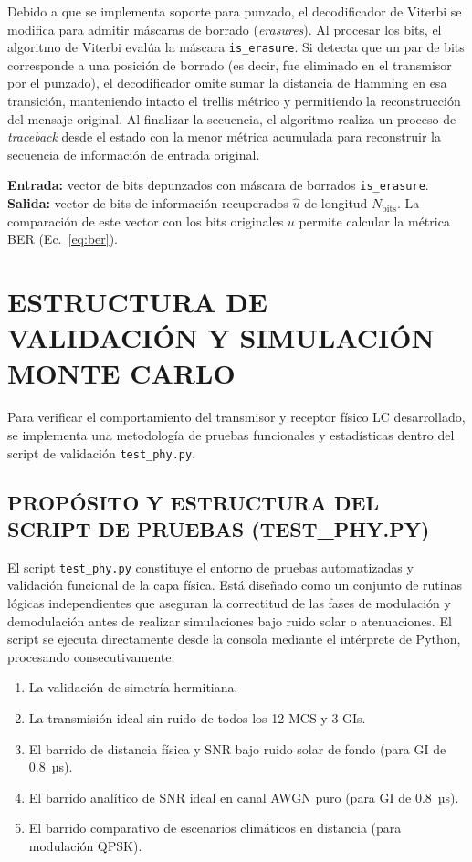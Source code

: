 Debido a que se implementa soporte para punzado, el decodificador de Viterbi se modifica para admitir máscaras de borrado (\textit{erasures}). Al procesar los bits, el algoritmo de Viterbi evalúa la máscara \texttt{is\_erasure}. Si detecta que un par de bits corresponde a una posición de borrado (es decir, fue eliminado en el transmisor por el punzado), el decodificador omite sumar la distancia de Hamming en esa transición, manteniendo intacto el trellis métrico y permitiendo la reconstrucción del mensaje original. Al finalizar la secuencia, el algoritmo realiza un proceso de \textit{traceback} desde el estado con la menor métrica acumulada para reconstruir la secuencia de información de entrada original.

\textbf{Entrada:} vector de bits depunzados con máscara de borrados \texttt{is\_erasure}. \textbf{Salida:} vector de bits de información recuperados $\hat{u}$ de longitud $N_{\text{bits}}$. La comparación de este vector con los bits originales $u$ permite calcular la métrica BER (Ec.~\ref{eq:ber}).

\section{ESTRUCTURA DE VALIDACIÓN Y SIMULACIÓN MONTE CARLO}
Para verificar el comportamiento del transmisor y receptor físico LC desarrollado, se implementa una metodología de pruebas funcionales y estadísticas dentro del script de validación \texttt{test\_phy.py}.

\subsection{PROPÓSITO Y ESTRUCTURA DEL SCRIPT DE PRUEBAS (TEST\_PHY.PY)}
El script \texttt{test\_phy.py} constituye el entorno de pruebas automatizadas y validación funcional de la capa física. Está diseñado como un conjunto de rutinas lógicas independientes que aseguran la correctitud de las fases de modulación y demodulación antes de realizar simulaciones bajo ruido solar o atenuaciones. El script se ejecuta directamente desde la consola mediante el intérprete de Python, procesando consecutivamente:
\begin{enumerate}
\item La validación de simetría hermitiana.
\item La transmisión ideal sin ruido de todos los 12 MCS y 3 GIs.
\item El barrido de distancia física y SNR bajo ruido solar de fondo (para GI de 0.8~µs).
\item El barrido analítico de SNR ideal en canal AWGN puro (para GI de 0.8~µs).
\item El barrido comparativo de escenarios climáticos en distancia (para modulación QPSK).
\end{enumerate}


